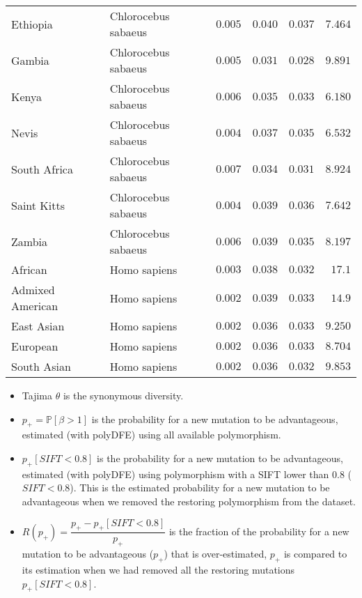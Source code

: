 \documentclass{article}
\newcommand{\proba}{\mathbb{P}}
\newcommand{\Spop}{\beta}
\newcommand{\polyAdv}{ \Spop > 1}
\newcommand{\PpolyAdv}{\proba \left[ \polyAdv \right]}
\begin{document}
\begin{center}
\begin{longtable}{|l|l|r|r|r|r|}
            Ethiopia             & Chlorocebus sabaeus & $ 0.005$              & $ 0.040$ & $ 0.037$            & $ 7.464$ \\
            Gambia               & Chlorocebus sabaeus & $ 0.005$              & $ 0.031$ & $ 0.028$            & $ 9.891$ \\
            Kenya                & Chlorocebus sabaeus & $ 0.006$              & $ 0.035$ & $ 0.033$            & $ 6.180$ \\
            Nevis                & Chlorocebus sabaeus & $ 0.004$              & $ 0.037$ & $ 0.035$            & $ 6.532$ \\
            South Africa         & Chlorocebus sabaeus & $ 0.007$              & $ 0.034$ & $ 0.031$            & $ 8.924$ \\
            Saint Kitts          & Chlorocebus sabaeus & $ 0.004$              & $ 0.039$ & $ 0.036$            & $ 7.642$ \\
            Zambia               & Chlorocebus sabaeus & $ 0.006$              & $ 0.039$ & $ 0.035$            & $ 8.197$ \\
            African              & Homo sapiens        & $ 0.003$              & $ 0.038$ & $ 0.032$            & $  17.1$   \\
            Admixed American     & Homo sapiens        & $ 0.002$              & $ 0.039$ & $ 0.033$            & $  14.9$   \\
            East Asian           & Homo sapiens        & $ 0.002$              & $ 0.036$ & $ 0.033$            & $ 9.250$ \\
            European             & Homo sapiens        & $ 0.002$              & $ 0.036$ & $ 0.033$            & $ 8.704$ \\
            South Asian          & Homo sapiens        & $ 0.002$              & $ 0.036$ & $ 0.032$            & $ 9.853$ \\
        \end{longtable}

    \end{center}
    \begin{itemize}
        \item Tajima $\theta$ is the synonymous diversity.
        \item $p_+=\PpolyAdv$ is the probability for a new mutation to be advantageous, estimated (with polyDFE) using all available polymorphism.
        \item $p_+ [ SIFT < 0.8]$ is the probability for a new mutation to be advantageous, estimated (with polyDFE) using polymorphism with a SIFT lower than 0.8 ($SIFT < 0.8$).
        This is the estimated probability for a new mutation to be advantageous when we removed the restoring polymorphism from the dataset.
        \item $R(p_+)=\dfrac{p_+ - p_+ [ SIFT < 0.8]}{p_+}$ is the fraction of the probability for a new mutation to be advantageous ($p_+$) that is over-estimated, $p_+$ is compared to its estimation when we had removed all the restoring mutations $p_+ [ SIFT < 0.8]$.
    \end{itemize}
    
\end{document}
